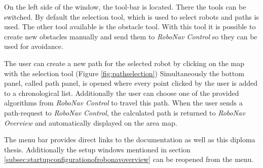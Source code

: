 
On the left side of the window, the tool-bar is located. There the tools can be switched. By default the selection tool, which is used to select robots and paths is used. The other tool available is the obstacle tool. With this tool it is possible to create new obstacles manually and send them to \textit{RoboNav Control} so they can be used for avoidance.

The user can create a new path for the selected robot by clicking on the map with the selection tool (Figure \ref{fig:pathselection}) Simultaneously the bottom panel, called path panel, is opened where every point clicked by the user is added to a chronological list. Additionally the user can choose one of the provided algorithms from \textit{RoboNav Control} to travel this path. When the user sends a path-request to \textit{RoboNav Control}, the calculated path is returned to \textit{RoboNav Overview} and automatically displayed on the area map.


The menu bar provides direct links to the documentation as well as this diploma thesis. Additionally the setup windows mentioned in section \ref{subsec:startupconfigurationofrobonavoverview} can be reopened from the menu.

